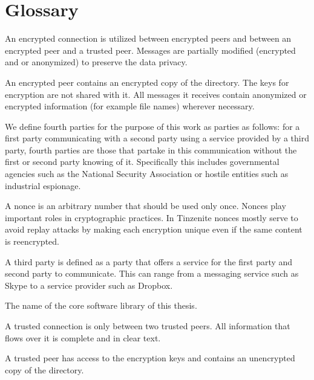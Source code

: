 \chapter{Glossary}
\label{chap:glossary}

\begin{description}[leftmargin=2em,style=nextline,noitemsep,nolistsep]
    \item[Encrypted Connection]
        An encrypted connection is utilized between encrypted peers and between an encrypted peer and a trusted peer.
        Messages are partially modified (encrypted and or anonymized) to preserve the data privacy.
    \item[Encrypted Peer]
        An encrypted peer contains an encrypted copy of the directory.
        The keys for encryption are not shared with it.
        All messages it receives contain anonymized or encrypted information (for example file names) wherever necessary.
    \item[Fourth Party]
        We define fourth parties for the purpose of this work as parties as follows: for a first party communicating with a second party using a service provided by a third party, fourth parties are those that partake in this communication without the first or second party knowing of it.
        Specifically this includes governmental agencies such as the National Security Association or hostile entities such as industrial espionage.
    \item[Nonce]
        A nonce is an arbitrary number that should be used only once.
        Nonces play important roles in cryptographic practices.
        In Tinzenite nonces mostly serve to avoid replay attacks by making each encryption unique even if the same content is reencrypted.
    \item[Third Party]
        A third party is defined as a party that offers a service for the first party and second party to communicate.
        This can range from a messaging service such as Skype to a service provider such as Dropbox.
    \item[Tinzenite]
        The name of the core software library of this thesis.
    \item[Trusted Connection]
        A trusted connection is only between two trusted peers.
        All information that flows over it is complete and in clear text.
    \item[Trusted Peer]
        A trusted peer has access to the encryption keys and contains an unencrypted copy of the directory.
\end{description}
